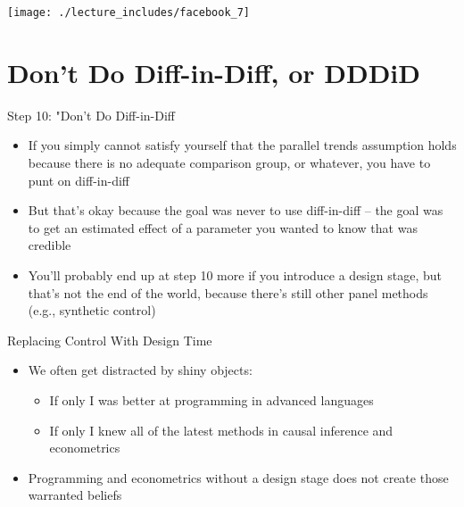 \documentclass{beamer}
\begin{document}
\begin{frame}
\begin{center}
\texttt{[image: ./lecture\_includes/facebook\_7]}
\end{center}
\end{frame}





\section{Don't Do Diff-in-Diff, or DDDiD}



\begin{frame}{Step 10: "Don't Do Diff-in-Diff}

\begin{itemize}
\item If you simply cannot satisfy yourself that the parallel trends assumption holds because there is no adequate comparison group, or whatever, you have to punt on diff-in-diff
\item But that's okay because the goal was never to use diff-in-diff -- the goal was to get an estimated effect of a parameter you wanted to know that was credible
\item You'll probably end up at step 10 more if you introduce a design stage, but that's not the end of the world, because there's still other panel methods (e.g., synthetic control)


\end{itemize}

\end{frame}

\begin{frame}{Replacing Control With Design Time}

\begin{itemize}
\item We often get distracted by shiny objects:
	\begin{itemize}
	\item If only I was better at programming in advanced languages
	\item If only I knew all of the latest methods in causal inference and econometrics
	\end{itemize}
\item Programming and econometrics without a design stage does not create those warranted beliefs
\end{itemize}

\end{frame}
\end{document}
